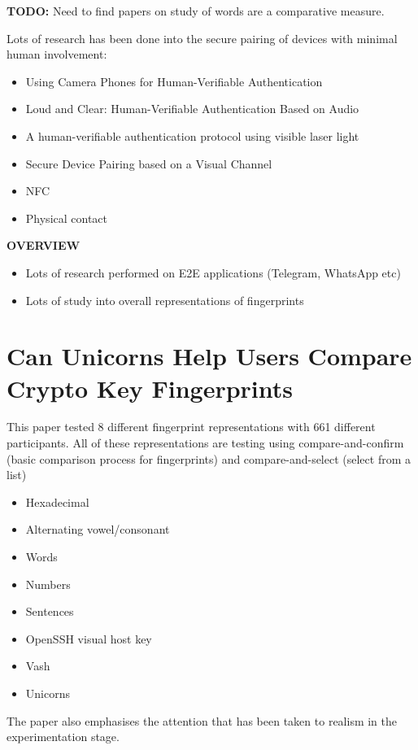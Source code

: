 \textbf{TODO:} Need to find papers on study of words are a comparative measure.

Lots of research has been done into the secure pairing of devices with minimal human involvement:

\begin{itemize}
    \item Using Camera Phones for Human-Verifiable Authentication
    \item Loud and Clear: Human-Verifiable Authentication Based on Audio
    \item A human-verifiable authentication protocol using visible laser light
    \item Secure Device Pairing based on a Visual Channel
    \item NFC
    \item Physical contact
\end{itemize}

\textbf{OVERVIEW} 
\begin{itemize}
    \item Lots of research performed on E2E applications (Telegram, WhatsApp etc)
    \item Lots of study into overall representations of fingerprints
\end{itemize}

\section{Can Unicorns Help Users Compare Crypto Key Fingerprints}

This paper tested 8 different fingerprint representations with 661 different participants. All of these representations are testing using compare-and-confirm (basic comparison process for fingerprints) and compare-and-select (select from a list)

\begin{itemize}
    \item Hexadecimal
    \item Alternating vowel/consonant
    \item Words
    \item Numbers
    \item Sentences
    \item OpenSSH visual host key
    \item Vash
    \item Unicorns
\end{itemize}

The paper also emphasises the attention that has been taken to realism in the experimentation stage.

